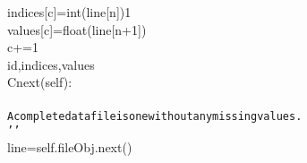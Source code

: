 {{\begin{tabbing}
\hspace{72pt}indices{[}c{]}\hspace{6pt}=\hspace{6pt}int(line{[}n{]})\dash{}1\\
\hspace{72pt}values{[}c{]}\hspace{6pt}=\hspace{6pt}float(line{[}n+1{]})\\
\hspace{72pt}c\hspace{6pt}+=\hspace{6pt}1\\
\hspace{6pt}id,indices,values\\
\hspace{6pt}Cnext(self):\\
\\
{\texttt{\hspace{72pt}A\hspace{6pt}complete\hspace{6pt}data\hspace{6pt}file\hspace{6pt}is\hspace{6pt}one\hspace{6pt}without\hspace{6pt}any\hspace{6pt}missing\hspace{6pt}values.}}\\
{\texttt{\hspace{48pt}{'}}}{\texttt{{'}{'}}}\\
\hspace{48pt}line\hspace{6pt}=\hspace{6pt}self.fileObj.next()\\

\end{tabbing}}}
